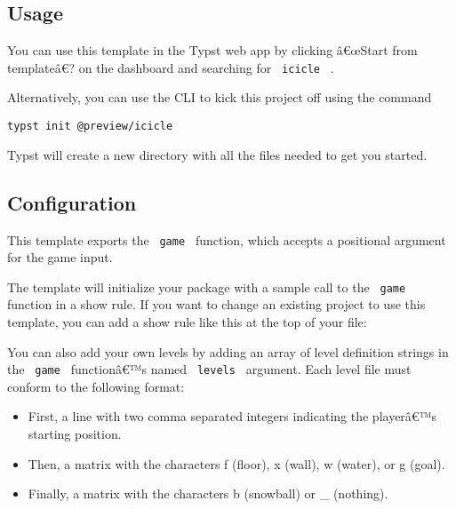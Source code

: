\subsection{Usage}\label{usage}

You can use this template in the Typst web app by clicking â€œStart from
templateâ€? on the dashboard and searching for \texttt{\ icicle\ } .

Alternatively, you can use the CLI to kick this project off using the
command

\begin{verbatim}
typst init @preview/icicle
\end{verbatim}

Typst will create a new directory with all the files needed to get you
started.

\subsection{Configuration}\label{configuration}

This template exports the \texttt{\ game\ } function, which accepts a
positional argument for the game input.

The template will initialize your package with a sample call to the
\texttt{\ game\ } function in a show rule. If you want to change an
existing project to use this template, you can add a show rule like this
at the top of your file:

\begin{Shaded}
\begin{Highlighting}[]

\end{Highlighting}
\end{Shaded}

You can also add your own levels by adding an array of level definition
strings in the \texttt{\ game\ } functionâ€™s named \texttt{\ levels\ }
argument. Each level file must conform to the following format:

\begin{itemize}
\tightlist
\item
  First, a line with two comma separated integers indicating the
  playerâ€™s starting position.
\item
  Then, a matrix with the characters f (floor), x (wall), w (water), or
  g (goal).
\item
  Finally, a matrix with the characters b (snowball) or \_ (nothing).
\end{itemize}

